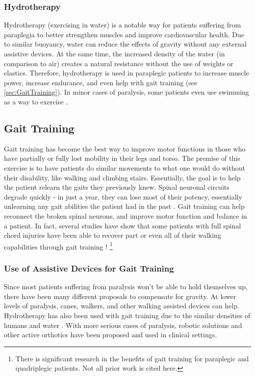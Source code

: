 \subsubsection{Hydrotherapy}
Hydrotherapy (exercising in water) is a notable way for patients suffering from paraplegia to better strengthen muscles and improve cardiovascular health. Due to similar buoyancy, water can reduce the effects of gravity without any external assistive devices. At the same time, the increased density of the water (in comparison to air) creates a natural resistance without the use of weights or elastics. Therefore, hydrotherapy is used in paraplegic patients to increase muscle power, increase endurance, and even help with gait training (see \autoref{sec:GaitTraining}). In minor cases of paralysis, some patients even use swimming as a way to exercise \cite{RehabParaplegia} \cite{BenefitsOfHydrotherapy}.

\subsection{Gait Training}
\label{sec:GaitTraining}

Gait training has become the best way to improve motor functions in those who have partially or fully lost mobility in their legs and torso. The premise of this exercise is to have patients do similar movements to what one would do without their disability, like walking and climbing stairs. Essentially, the goal is to help the patient relearn the gaits they previously knew. Spinal neuronal circuits degrade quickly - in just a year, they can lose most of their potency, essentially unlearning any gait abilities the patient had in the past \cite{GaitTrainingClinical} \cite{RehabParaplegia} \cite{TrunkMuscleLoadingParaplegia}. Gait training can help reconnect the broken spinal neurons, and improve motor function and balance in a patient. In fact, several studies have show that some patients with full spinal chord injuries have been able to recover part or even all of their walking capabilities through gait training \cite{GaitTrainingClinical} \cite{ImprovingGaitAdaptabilityInPatients}! 
\footnote{There is significant research in the benefits of gait training for paraplegic and quadriplegic patients. Not all prior work is cited here.} 

\subsubsection{Use of Assistive Devices for Gait Training}
Since most patients suffering from paralysis won't be able to hold themselves up, there have been many different proposals to compensate for gravity. At lower levels of paralysis, canes, walkers, and other walking assisted devices can help. Hydrotherapy has also been used with gait training due to the similar densities of humans and water \cite{BenefitsOfHydrotherapy}. With more serious cases of paralysis, robotic solutions and other active orthotics have been proposed and used in clinical settings.


